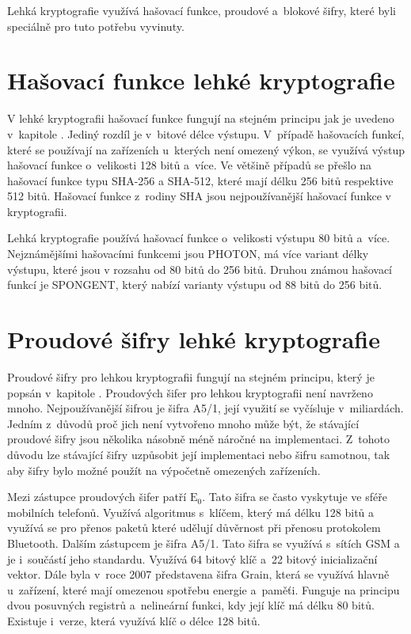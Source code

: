 Lehká kryptografie využívá hašovací funkce, proudové a~blokové šifry, které byli speciálně pro tuto potřebu vyvinuty.\cite{Klima}


\section{Hašovací funkce lehké kryptografie}
V lehké kryptografii hašovací funkce fungují na stejném principu jak je uvedeno v~kapitole . Jediný rozdíl je v~bitové délce výstupu. V~případě hašovacích funkcí, které se používají na zařízeních u~kterých není omezený výkon, se využívá výstup hašovací funkce o~velikosti 128 bitů a~více. Ve většině případů se přešlo na hašovací funkce typu SHA-256 a SHA-512, které mají délku 256 bitů respektive 512 bitů. Hašovací funkce z~rodiny SHA jsou nejpoužívanější hašovací funkce v kryptografii. 

Lehká kryptografie používá hašovací funkce o~velikosti výstupu 80 bitů a~více. Nejznámějšími hašovacími funkcemi jsou PHOTON, má více variant délky výstupu, které jsou v rozsahu od 80 bitů do 256 bitů. Druhou známou hašovací funkcí je SPONGENT, který nabízí varianty výstupu od 88 bitů do 256 bitů.\cite{LightHash}

\section{Proudové šifry lehké kryptografie}
Proudové šifry pro lehkou kryptografii fungují na stejném principu, který je popsán v~kapitole . Proudových šifer pro lehkou kryptografii není navrženo mnoho. Nejpoužívanější šifrou je šifra A5/1, její využití se vyčísluje v~miliardách. Jedním z~důvodů proč jich není vytvořeno mnoho může být, že stávající proudové šifry jsou několika násobně méně náročné na implementaci. Z~tohoto důvodu lze stávající šifry uzpůsobit její implementaci nebo šifru samotnou, tak aby šifry bylo možné použít na výpočetně omezených zařízeních.\cite{SaldaBP}

Mezi zástupce proudových šifer patří $\mathrm{E_0}$. Tato šifra se často vyskytuje ve sféře mobilních telefonů. Využívá algoritmus s~klíčem, který má délku 128 bitů a využívá se pro přenos paketů které udělují důvěrnost při přenosu protokolem Bluetooth. Dalším zástupcem je šifra A5/1. Tato šifra se využívá s~sítích GSM a je i~součástí jeho standardu. Využívá 64 bitový klíč a~22 bitový inicializační vektor. Dále byla v~roce 2007 představena šifra Grain, která se využívá hlavně u~zařízení, které mají omezenou spotřebu energie a~paměťi. Funguje na principu dvou posuvných registrů a~nelineární funkci, kdy její klíč má délku 80 bitů. Existuje i~verze, která využívá klíč o délce 128 bitů.\cite{SaldaBP} %

